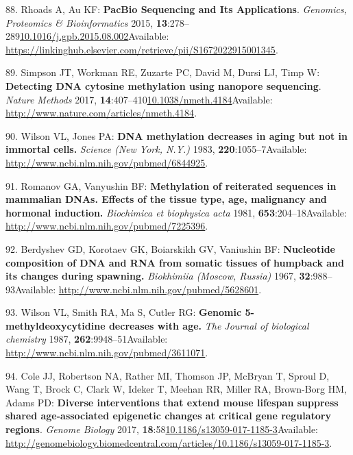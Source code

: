 \documentclass[
]{book}
\begin{document}
\leavevmode\hypertarget{ref-Rhoads2015}{}%
88. Rhoads A, Au KF: \textbf{PacBio Sequencing and Its Applications}. \emph{Genomics, Proteomics \& Bioinformatics} 2015, \textbf{13}:278--289\href{https://doi.org/10.1016/j.gpb.2015.08.002}{10.1016/j.gpb.2015.08.002}Available: \url{https://linkinghub.elsevier.com/retrieve/pii/S1672022915001345}.

\leavevmode\hypertarget{ref-Simpson2017}{}%
89. Simpson JT, Workman RE, Zuzarte PC, David M, Dursi LJ, Timp W: \textbf{Detecting DNA cytosine methylation using nanopore sequencing}. \emph{Nature Methods} 2017, \textbf{14}:407--410\href{https://doi.org/10.1038/nmeth.4184}{10.1038/nmeth.4184}Available: \url{http://www.nature.com/articles/nmeth.4184}.

\leavevmode\hypertarget{ref-Wilson1983}{}%
90. Wilson VL, Jones PA: \textbf{DNA methylation decreases in aging but not in immortal cells.} \emph{Science (New York, N.Y.)} 1983, \textbf{220}:1055--7Available: \url{http://www.ncbi.nlm.nih.gov/pubmed/6844925}.

\leavevmode\hypertarget{ref-Romanov1981}{}%
91. Romanov GA, Vanyushin BF: \textbf{Methylation of reiterated sequences in mammalian DNAs. Effects of the tissue type, age, malignancy and hormonal induction.} \emph{Biochimica et biophysica acta} 1981, \textbf{653}:204--18Available: \url{http://www.ncbi.nlm.nih.gov/pubmed/7225396}.

\leavevmode\hypertarget{ref-Berdyshev1967}{}%
92. Berdyshev GD, Korotaev GK, Boiarskikh GV, Vaniushin BF: \textbf{Nucleotide composition of DNA and RNA from somatic tissues of humpback and its changes during spawning.} \emph{Biokhimiia (Moscow, Russia)} 1967, \textbf{32}:988--93Available: \url{http://www.ncbi.nlm.nih.gov/pubmed/5628601}.

\leavevmode\hypertarget{ref-Wilson1987}{}%
93. Wilson VL, Smith RA, Ma S, Cutler RG: \textbf{Genomic 5-methyldeoxycytidine decreases with age.} \emph{The Journal of biological chemistry} 1987, \textbf{262}:9948--51Available: \url{http://www.ncbi.nlm.nih.gov/pubmed/3611071}.

\leavevmode\hypertarget{ref-Cole2017}{}%
94. Cole JJ, Robertson NA, Rather MI, Thomson JP, McBryan T, Sproul D, Wang T, Brock C, Clark W, Ideker T, Meehan RR, Miller RA, Brown-Borg HM, Adams PD: \textbf{Diverse interventions that extend mouse lifespan suppress shared age-associated epigenetic changes at critical gene regulatory regions}. \emph{Genome Biology} 2017, \textbf{18}:58\href{https://doi.org/10.1186/s13059-017-1185-3}{10.1186/s13059-017-1185-3}Available: \url{http://genomebiology.biomedcentral.com/articles/10.1186/s13059-017-1185-3}.
\end{document}
